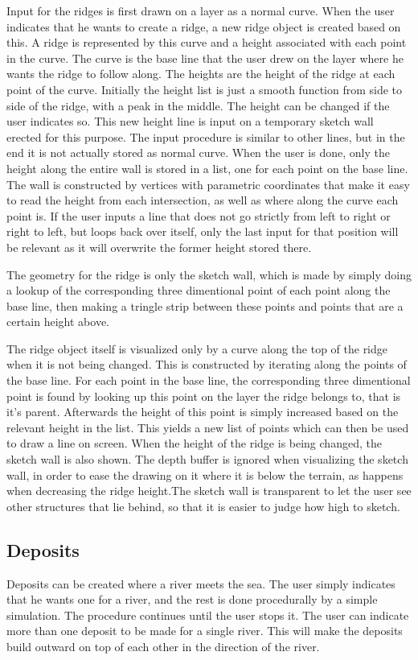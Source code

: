 \documentclass[a4paper,12pt]{report}
\begin{document}
Input for the ridges is first drawn on a layer as a normal curve. When the user indicates that he wants to create a ridge, a new ridge object is created based on this. A ridge is represented by this curve and a height associated with each point in the curve. The curve is the base line that the user drew on the layer where he wants the ridge to follow along. The heights are the height of the ridge at each point of the curve. Initially the height list is just a smooth function from side to side of the ridge, with a peak in the middle. The height can be changed if the user indicates so. This new height line is input on a temporary sketch wall erected for this purpose. The input procedure is similar to other lines, but in the end it is not actually stored as normal curve. When the user is done, only the height along the entire wall is stored in a list, one for each point on the base line. The wall is constructed by vertices with parametric coordinates that make it easy to read the height from each intersection, as 
well as where along the curve each point is. If the user inputs a line that does not go strictly from left to right or right to left, but loops back over itself, only the last input for that position will be relevant as it will overwrite the former height stored there.

The geometry for the ridge is only the sketch wall, which is made by simply doing a lookup of the corresponding three dimentional point of each point along the base line, then making a tringle strip between these points and points that are a certain height above.

The ridge object itself is visualized only by a curve along the top of the ridge when it is not being changed. This is constructed by iterating along the points of the base line. For each point in the base line, the corresponding three dimentional point is found by looking up this point on the layer the ridge belongs to, that is it's parent. Afterwards the height of this point is simply increased based on the relevant height in the list. This yields a new list of points which can then be used to draw a line on screen. When the height of the ridge is being changed, the sketch wall is also shown. The depth buffer is ignored when visualizing the sketch wall, in order to ease the drawing on it where it is below the terrain, as happens when decreasing the ridge height.The sketch wall is transparent to let the user see other structures that lie behind, so that it is easier to judge how high to sketch.

\subsection{Deposits}
Deposits can be created where a river meets the sea. The user simply indicates that he wants one for a river, and the rest is done procedurally by a simple simulation. The procedure continues until the user stops it. The user can indicate more than one deposit to be made for a single river. This will make the deposits build outward on top of each other in the direction of the river.
\end{document}

